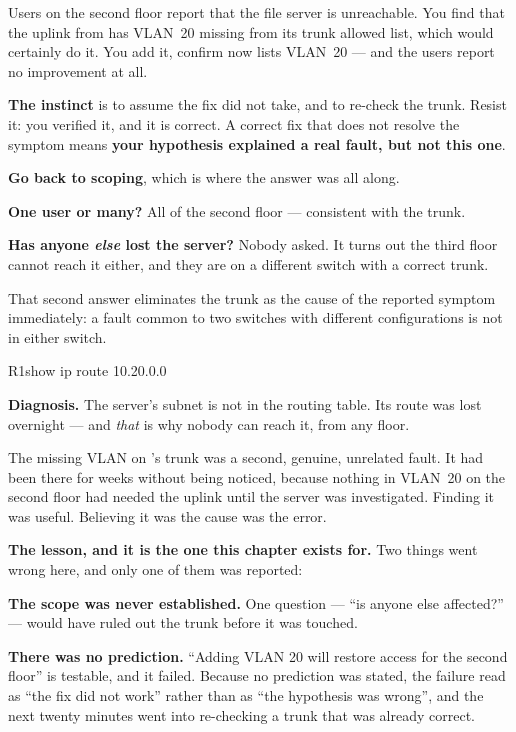 \begin{breakfix}
Users on the second floor report that the file server is unreachable. You find
that the uplink from  has VLAN~20 missing from its trunk allowed list,
which would certainly do it. You add it, confirm  now
lists VLAN~20 --- and the users report no improvement at all.

\textbf{The instinct} is to assume the fix did not take, and to re-check the
trunk. Resist it: you verified it, and it is correct. A correct fix that does not
resolve the symptom means \textbf{your hypothesis explained a real fault, but not
this one}.

\textbf{Go back to scoping}, which is where the answer was all along.

\begin{tight}
  \item \textbf{One user or many?} All of the second floor --- consistent with
        the trunk.
  \item \textbf{Has anyone \emph{else} lost the server?} Nobody asked. It turns
        out the third floor cannot reach it either, and they are on a different
        switch with a correct trunk.
\end{tight}

That second answer eliminates the trunk as the cause of the reported symptom
immediately: a fault common to two switches with different configurations is not
in either switch.

\begin{verify}{R1}{show ip route 10.20.0.0}
\end{verify}

\textbf{Diagnosis.} The server's subnet is not in the routing table. Its route was
lost overnight --- and \emph{that} is why nobody can reach it, from any floor.

The missing VLAN on 's trunk was a second, genuine, unrelated fault. It
had been there for weeks without being noticed, because nothing in VLAN~20 on the
second floor had needed the uplink until the server was investigated. Finding it
was useful. Believing it was the cause was the error.

\textbf{The lesson, and it is the one this chapter exists for.} Two things went
wrong here, and only one of them was reported:

\begin{tight}
  \item \textbf{The scope was never established.} One question --- ``is anyone
        else affected?'' --- would have ruled out the trunk before it was
        touched.
  \item \textbf{There was no prediction.} ``Adding VLAN 20 will restore access
        for the second floor'' is testable, and it failed. Because no prediction
        was stated, the failure read as ``the fix did not work'' rather than as
        ``the hypothesis was wrong'', and the next twenty minutes went into
        re-checking a trunk that was already correct.
\end{tight}


\end{breakfix}
